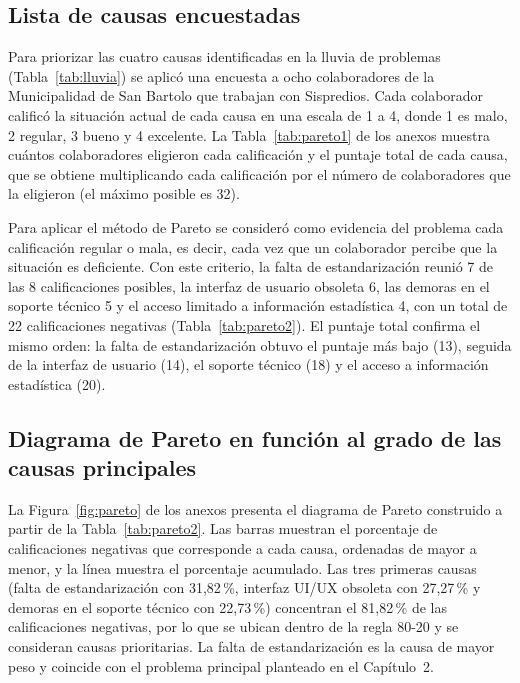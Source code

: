 \documentclass[12pt,a4paper]{report}
\newcounter{anexo}
\begin{document}
\subsection{Lista de causas encuestadas}

Para priorizar las cuatro causas identificadas en la lluvia de problemas (Tabla~\ref{tab:lluvia}) se aplicó una encuesta a ocho colaboradores de la Municipalidad de San Bartolo que trabajan con Sispredios. Cada colaborador calificó la situación actual de cada causa en una escala de 1 a 4, donde 1 es malo, 2 regular, 3 bueno y 4 excelente. La Tabla~\ref{tab:pareto1} de los anexos muestra cuántos colaboradores eligieron cada calificación y el puntaje total de cada causa, que se obtiene multiplicando cada calificación por el número de colaboradores que la eligieron (el máximo posible es 32).

Para aplicar el método de Pareto se consideró como evidencia del problema cada calificación regular o mala, es decir, cada vez que un colaborador percibe que la situación es deficiente. Con este criterio, la falta de estandarización reunió 7 de las 8 calificaciones posibles, la interfaz de usuario obsoleta 6, las demoras en el soporte técnico 5 y el acceso limitado a información estadística 4, con un total de 22 calificaciones negativas (Tabla~\ref{tab:pareto2}). El puntaje total confirma el mismo orden: la falta de estandarización obtuvo el puntaje más bajo (13), seguida de la interfaz de usuario (14), el soporte técnico (18) y el acceso a información estadística (20).

\subsection{Diagrama de Pareto en función al grado de las causas principales}
\label{sec:pareto}

La Figura~\ref{fig:pareto} de los anexos presenta el diagrama de Pareto construido a partir de la Tabla~\ref{tab:pareto2}. Las barras muestran el porcentaje de calificaciones negativas que corresponde a cada causa, ordenadas de mayor a menor, y la línea muestra el porcentaje acumulado. Las tres primeras causas (falta de estandarización con 31,82\,\%, interfaz UI/UX obsoleta con 27,27\,\% y demoras en el soporte técnico con 22,73\,\%) concentran el 81,82\,\% de las calificaciones negativas, por lo que se ubican dentro de la regla 80-20 y se consideran causas prioritarias. La falta de estandarización es la causa de mayor peso y coincide con el problema principal planteado en el Capítulo~2.
\end{document}
